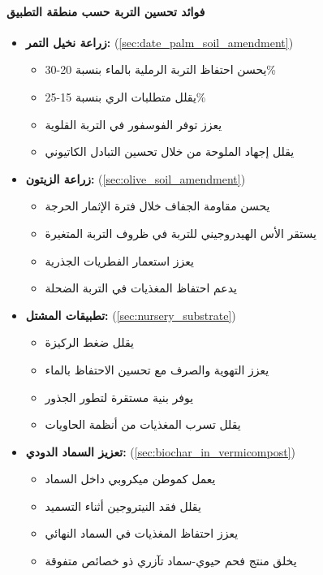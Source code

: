 \paragraph{فوائد تحسين التربة حسب منطقة التطبيق}
\begin{itemize}
    \item \textbf{زراعة نخيل التمر:} (\ref{sec:date_palm_soil_amendment})
    \begin{itemize}
        \item يحسن احتفاظ التربة الرملية بالماء بنسبة 20-30\%
        \item يقلل متطلبات الري بنسبة 15-25\%
        \item يعزز توفر الفوسفور في التربة القلوية
        \item يقلل إجهاد الملوحة من خلال تحسين التبادل الكاتيوني
    \end{itemize}
    
    \item \textbf{زراعة الزيتون:} (\ref{sec:olive_soil_amendment})
    \begin{itemize}
        \item يحسن مقاومة الجفاف خلال فترة الإثمار الحرجة
        \item يستقر الأس الهيدروجيني للتربة في ظروف التربة المتغيرة
        \item يعزز استعمار الفطريات الجذرية
        \item يدعم احتفاظ المغذيات في التربة الضحلة
    \end{itemize}
    
    \item \textbf{تطبيقات المشتل:} (\ref{sec:nursery_substrate})
    \begin{itemize}
        \item يقلل ضغط الركيزة
        \item يعزز التهوية والصرف مع تحسين الاحتفاظ بالماء
        \item يوفر بنية مستقرة لتطور الجذور
        \item يقلل تسرب المغذيات من أنظمة الحاويات
    \end{itemize}
    
    \item \textbf{تعزيز السماد الدودي:} (\ref{sec:biochar_in_vermicompost})
    \begin{itemize}
        \item يعمل كموطن ميكروبي داخل السماد
        \item يقلل فقد النيتروجين أثناء التسميد
        \item يعزز احتفاظ المغذيات في السماد النهائي
        \item يخلق منتج فحم حيوي-سماد تآزري ذو خصائص متفوقة
    \end{itemize}
\end{itemize}


